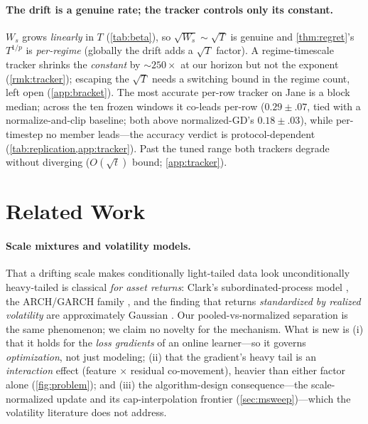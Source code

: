\documentclass{article}
\begin{document}
\paragraph{The drift is a genuine rate; the tracker controls only its constant.} $W_s$ grows
\emph{linearly} in $T$ (\cref{tab:beta}), so $\sqrt{W_s}\sim\sqrt T$ is genuine and
\cref{thm:regret}'s $T^{1/p}$ is \emph{per-regime} (globally the drift adds a $\sqrt T$
factor). A regime-timescale tracker shrinks the \emph{constant} by $\sim\!250\times$ at our
horizon but not the exponent (\cref{rmk:tracker}); escaping the $\sqrt T$ needs a switching
bound in the regime count, left open (\cref{app:bracket}). The most accurate per-row tracker
on Jane is a block median; across the ten frozen windows it co-leads per-row
($0.29\!\pm\!.07$, tied with a normalize-and-clip baseline; both above normalized-GD's
$0.18\!\pm\!.03$), while per-timestep no member leads---the accuracy verdict is
protocol-dependent (\cref{tab:replication,app:tracker}). Past
the tuned range both trackers degrade without diverging ($O(\sqrt t)$ bound; \cref{app:tracker}).

\section{Related Work}
\label{sec:related}

\paragraph{Scale mixtures and volatility models.} That a drifting scale makes
conditionally light-tailed data look unconditionally heavy-tailed is classical \emph{for
asset returns}: Clark's subordinated-process model \citep{clark1973}, the ARCH/GARCH family
\citep{engle1982,bollerslev1986}, and the finding that returns \emph{standardized by
realized volatility} are approximately Gaussian \citep{andersen2001}. Our
pooled-vs-normalized separation is the same phenomenon; we claim no novelty for the
mechanism. What is new is (i) that it holds for the \emph{loss gradients} of an online
learner---so it governs \emph{optimization}, not just modeling; (ii) that the gradient's
heavy tail is an \emph{interaction} effect (feature $\times$ residual co-movement), heavier
than either factor alone (\cref{fig:problem}); and (iii) the algorithm-design
consequence---the scale-normalized update and its cap-interpolation frontier
(\cref{sec:msweep})---which the volatility literature does not address.
\end{document}
